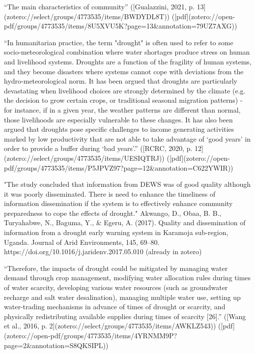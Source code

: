 {“The main characteristics of community” ([Gualazzini, 2021, p. 13](zotero://select/groups/4773535/items/BWDYDL8T)) ([pdf](zotero://open-pdf/groups/4773535/items/8U5XVU5K?page=13&annotation=79UZ7AXG))

“In humanitarian practice, the term "drought" is often used to refer to some socio-meteorological combination where water shortages produce stress on human and livelihood systems. Droughts are a function of the fragility of human systems, and they become disasters where systems cannot cope with deviations from the hydro-meteorological norm. It has been argued that droughts are particularly devastating when livelihood choices are strongly determined by the climate (e.g. the decision to grow certain crops, or traditional seasonal migration patterns) - for instance, if in a given year, the weather patterns are different than normal, those livelihoods are especially vulnerable to these changes. It has also been argued that droughts pose specific challenges to income generating activities marked by low productivity that are not able to take advantage of ‘good years’ in order to provide a buffer during ‘bad years’.” ([RCRC, 2020, p. 12](zotero://select/groups/4773535/items/UESIQTRJ)) ([pdf](zotero://open-pdf/groups/4773535/items/P5JPVZ97?page=12&annotation=C622YWIR))

"The study concluded that information from DEWS was of good quality although it was poorly disseminated. There is need to enhance the timeliness of information dissemination if the system is to effectively enhance community preparedness to cope the effects of drought." Akwango, D., Obaa, B. B., Turyahabwe, N., Baguma, Y., & Egeru, A. (2017). Quality and dissemination of information from a drought early warning system in Karamoja sub-region, Uganda. Journal of Arid Environments, 145, 69–80. https://doi.org/10.1016/j.jaridenv.2017.05.010 (already in zotero)


“Therefore, the impacts of drought could be mitigated by managing water demand through crop management, modifying water allocation rules during times of water scarcity, developing various water resources (such as groundwater recharge and salt water desalination), managing multiple water use, setting up water-trading mechanisms in advance of times of drought or scarcity, and physically redistributing available supplies during times of scarcity [26].” ([Wang et al., 2016, p. 2](zotero://select/groups/4773535/items/AWKLZ543)) ([pdf](zotero://open-pdf/groups/4773535/items/4YRNMM9P?page=2&annotation=S8QKSIPL))

}
